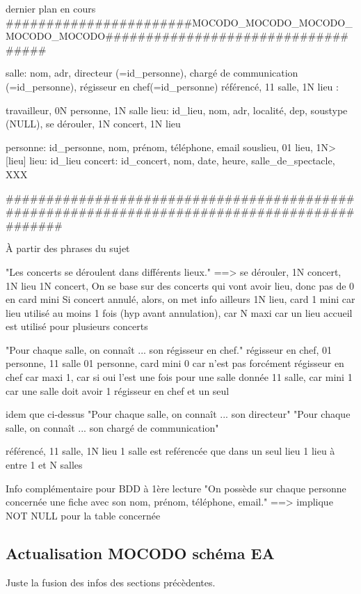 \documentclass[12pt,a4paper]{article}
\begin{document}
{dernier plan en cours
#######################MOCODO_MOCODO_MOCODO_MOCODO_MOCODO###################################

salle: nom, adr, directeur (=id_personne), chargé de communication (=id_personne), régisseur en chef(=id_personne)
référencé, 11 salle, 1N lieu
:

travailleur, 0N personne, 1N salle
lieu: id_lieu, nom, adr, localité, dep, soustype (NULL),
se dérouler, 1N concert, 1N lieu

personne: id_personne, nom, prénom, téléphone, email
souslieu, 01 lieu,   1N> [lieu] lieu: id_lieu
concert: id_concert, nom, date, heure, salle_de_spectacle, XXX

#############################################################################################



À partir des phrases du sujet

"Les concerts se déroulent dans différents lieux."
==> se dérouler, 1N concert, 1N lieu
1N concert, On se base sur des concerts qui vont avoir lieu, donc pas de 0 en card mini
Si concert annulé, alors, on met info ailleurs
1N lieu, card 1 mini car lieu utilisé au moins 1 fois (hyp avant annulation),
car N maxi car un lieu accueil est utilisé pour plusieurs concerts 


"Pour chaque salle, on connaît ... son régisseur en chef."
régisseur en chef, 01 personne, 11 salle
01 personne, card mini 0 car n'est pas forcément régisseur en chef
car maxi 1, car si oui l'est une fois pour une salle donnée
11 salle, car mini 1 car une salle doit avoir 1 régisseur en chef et un seul

idem que ci-dessus
"Pour chaque salle, on connaît ... son directeur"
"Pour chaque salle, on connaît ... son chargé de communication"



référencé, 11 salle, 1N lieu
1 salle est reférencée que dans un seul lieu
1 lieu à entre 1 et N salles



Info complémentaire pour BDD à 1ère lecture
"On possède sur chaque personne concernée une fiche avec son nom, prénom, téléphone, email."
==> implique NOT NULL pour la table concernée



\subsection{Actualisation MOCODO schéma EA}
Juste la fusion des infos des sections précèdentes.

}
\end{document}
